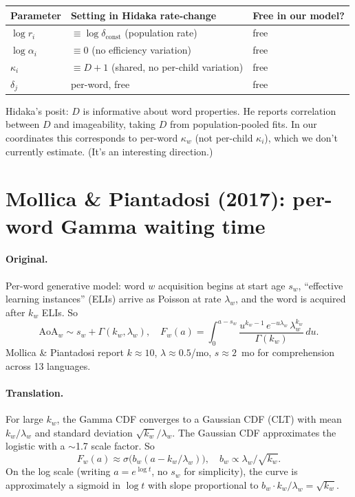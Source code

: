 \documentclass[11pt]{article}
\begin{document}
\begin{center}
\renewcommand{\arraystretch}{1.10}
\begin{tabular}{@{}lll@{}}
\toprule
\textbf{Parameter} & \textbf{Setting in Hidaka rate-change} & \textbf{Free in our model?} \\
\midrule
$\log r_i$         & $\equiv \log \delta_{\text{const}}$ (population rate) & free \\
$\log \alpha_i$    & $\equiv 0$ (no efficiency variation) & free \\
$\kappa_i$         & $\equiv D + 1$ (shared, no per-child variation) & free \\
$\delta_j$         & per-word, free                                  & free \\
\bottomrule
\end{tabular}
\end{center}

Hidaka's posit: $D$ is informative about word properties.
He reports correlation between $D$ and imageability, taking $D$
from population-pooled fits. In our coordinates this corresponds
to per-word $\kappa_w$ (not per-child $\kappa_i$), which we don't
currently estimate. (It's an interesting direction.)

\section{Mollica \& Piantadosi (2017): per-word Gamma waiting time}

\paragraph{Original.}
Per-word generative model: word $w$ acquisition begins at start age
$s_w$, ``effective learning instances'' (ELIs) arrive as Poisson at
rate $\lambda_w$, and the word is acquired after $k_w$ ELIs. So
\begin{equation}
\mathrm{AoA}_w \sim s_w + \Gamma(k_w, \lambda_w),
\quad
F_w(a) = \int_0^{a-s_w} \frac{u^{k_w-1}\,e^{-u\lambda_w}\,\lambda_w^{k_w}}{\Gamma(k_w)}\,du.
\end{equation}
Mollica \& Piantadosi report $k \approx 10$, $\lambda \approx 0.5$/mo,
$s \approx 2$~mo for comprehension across 13 languages.

\paragraph{Translation.}
For large $k_w$, the Gamma CDF converges to a Gaussian CDF (CLT) with
mean $k_w/\lambda_w$ and standard deviation $\sqrt{k_w}/\lambda_w$.
The Gaussian CDF approximates the logistic with a $\sim$1.7 scale
factor. So
\begin{equation}
F_w(a) \approx \sigma\!\big(b_w (a - k_w/\lambda_w)\big),
\quad
b_w \propto \lambda_w/\sqrt{k_w}.
\end{equation}
On the log scale (writing $a = e^{\log t}$, no $s_w$ for simplicity),
the curve is approximately a sigmoid in $\log t$ with slope
proportional to $b_w \cdot k_w/\lambda_w = \sqrt{k_w}$.
\end{document}
